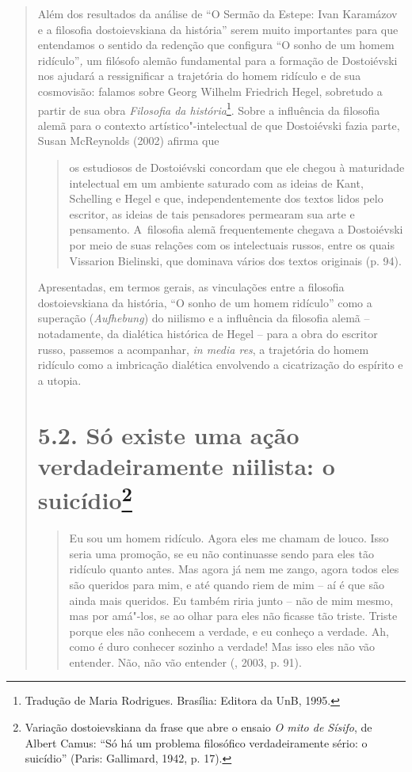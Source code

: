 {\begin{quote}
Além dos resultados da análise de ``O Sermão da Estepe: Ivan Karamázov e
a filosofia dostoievskiana da história'' serem muito importantes para
que entendamos o sentido da redenção que configura ``O sonho de um homem
ridículo''\emph{,} um filósofo alemão fundamental para a formação de
Dostoiévski nos ajudará a ressignificar a trajetória do homem ridículo e
de sua cosmovisão: falamos sobre Georg Wilhelm Friedrich Hegel,
sobretudo a partir de sua obra \emph{Filosofia da história}\footnote{Tradução
  de Maria Rodrigues. Brasília: Editora da UnB, 1995.}. Sobre a
influência da filosofia alemã para o contexto artístico"-intelectual de
que Dostoiévski fazia parte, Susan McReynolds (2002) afirma que

\begin{quote}
os estudiosos de Dostoiévski concordam que ele chegou à maturidade
intelectual em um ambiente saturado com as ideias de Kant, Schelling e
Hegel e que, independentemente dos textos lidos pelo escritor, as ideias
de tais pensadores permearam sua arte e pensamento. A~filosofia alemã
frequentemente chegava a Dostoiévski por meio de suas relações com os
intelectuais russos, entre os quais Vissarion Bielinski, que dominava
vários dos textos originais (p. 94).
\end{quote}

Apresentadas, em termos gerais, as vinculações entre a filosofia
dostoievskiana da história, ``O sonho de um homem ridículo'' como a
superação (\emph{Aufhebung}) do niilismo e a influência da filosofia
alemã -- notadamente, da dialética histórica de Hegel -- para a obra do
escritor russo, passemos a acompanhar, \emph{in media res}, a trajetória
do homem ridículo como a imbricação dialética envolvendo a cicatrização
do espírito e a utopia.

\section{5.2. Só existe uma ação verdadeiramente niilista: o
suicídio\protect\footnote{Variação dostoievskiana da frase que abre o ensaio
  \emph{O mito de Sísifo}, de Albert Camus: ``Só há um problema
  filosófico verdadeiramente sério: o suicídio'' (Paris: Gallimard,
  1942, p. 17).}}

\begin{quote}
Eu sou um homem ridículo. Agora eles me chamam de louco. Isso seria uma
promoção, se eu não continuasse sendo para eles tão ridículo quanto
antes. Mas agora já nem me zango, agora todos eles são queridos para
mim, e até quando riem de mim -- aí é que são ainda mais queridos. Eu
também riria junto -- não de mim mesmo, mas por amá"-los, se ao olhar
para eles não ficasse tão triste. Triste porque eles não conhecem a
verdade, e eu conheço a verdade. Ah, como é duro conhecer sozinho a
verdade! Mas isso eles não vão entender. Não, não vão entender
(, 2003, p. 91).
\end{quote}


\end{quote}}
